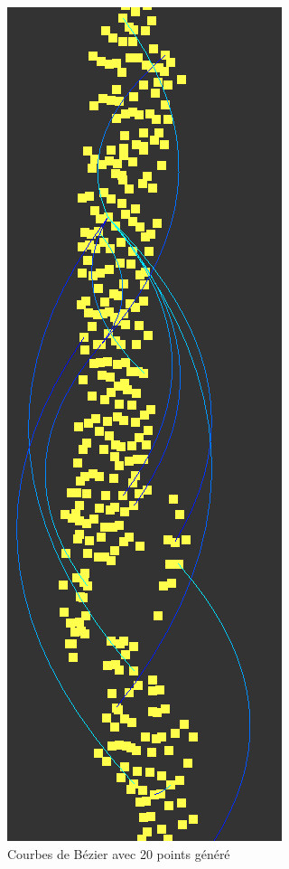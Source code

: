 \documentclass[12pt]{article}
\begin{document}
		\begin{figure}[!h]
		\begin{center}
		\includegraphics[scale=.60]{20_generated_points.png}
		\caption{Courbes de Bézier avec 20 points généré}
		\end{center}
		\end{figure}
		
\end{document}
